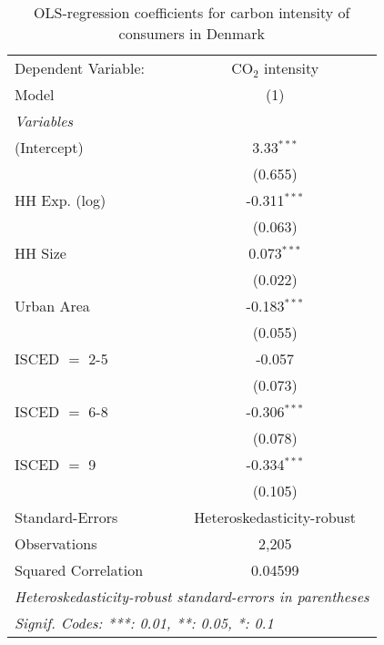 
\begin{table}[htbp!]
   \centering
   \small
   \begin{adjustbox}{width = 1\textwidth, max height = 0.95\textheight, center}
      \begin{threeparttable}[b]
         \caption{\label{tab:OLS_1_DNK} OLS-regression coefficients for carbon intensity of consumers in Denmark}
         \begin{tabular}{lc}
            \tabularnewline \midrule \midrule
            Dependent Variable: & CO$_{2}$ intensity\\  
            Model               & (1)\\  
            \midrule
            \emph{Variables}\\
            (Intercept)         & 3.33$^{***}$\\   
                                & (0.655)\\   
            HH Exp. (log)       & -0.311$^{***}$\\   
                                & (0.063)\\   
            HH Size             & 0.073$^{***}$\\   
                                & (0.022)\\   
            Urban Area          & -0.183$^{***}$\\   
                                & (0.055)\\   
            ISCED $=$ 2-5       & -0.057\\   
                                & (0.073)\\   
            ISCED $=$ 6-8       & -0.306$^{***}$\\   
                                & (0.078)\\   
            ISCED $=$ 9         & -0.334$^{***}$\\   
                                & (0.105)\\   
            \midrule 
            Standard-Errors     & Heteroskedasticity-robust \\   
            Observations        & 2,205\\  
            Squared Correlation & 0.04599\\  
            \midrule \midrule
            \multicolumn{2}{l}{\emph{Heteroskedasticity-robust standard-errors in parentheses}}\\
            \multicolumn{2}{l}{\emph{Signif. Codes: ***: 0.01, **: 0.05, *: 0.1}}\\
         \end{tabular}
         

\end{threeparttable}
\end{adjustbox}
\end{table}
